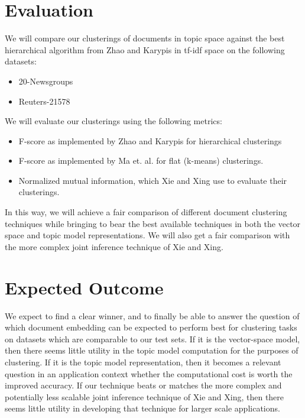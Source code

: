 \documentclass{sig-alternate-05-2015}
\begin{document}
\section{Evaluation}
We will compare our clusterings of documents in topic space against the best hierarchical algorithm from Zhao and Karypis in tf-idf space on the following datasets:
\begin{itemize}
\item 20-Newsgroups
\item Reuters-21578
\end{itemize}
We will evaluate our clusterings using the following metrics:
\begin{itemize}
\item F-score as implemented by Zhao and Karypis for hierarchical clusterings
\item F-score as implemented by Ma et. al. for flat (k-means) clusterings.  
\item Normalized mutual information, which Xie and Xing use to evaluate their clusterings.
\end{itemize}

\par
In this way, we will achieve a fair comparison of different document clustering techniques while bringing to bear the best available techniques in both the vector space and topic model representations. We will also get a fair comparison with the more complex joint inference technique of Xie and Xing.


\section{Expected Outcome}
We expect to find a clear winner, and to finally be able to answer the question of which document embedding can be expected to perform best for clustering tasks on datasets which are comparable to our test sets.  If it is the vector-space model, then there seems little utility in the topic model computation for the purposes of clustering. If it is the topic model representation, then it becomes a relevant question in an application context whether the computational cost is worth the improved accuracy.  If our technique beats or matches the more complex and potentially less scalable joint inference technique of Xie and Xing, then there seems little utility in developing that technique for larger scale applications.


\end{document}
